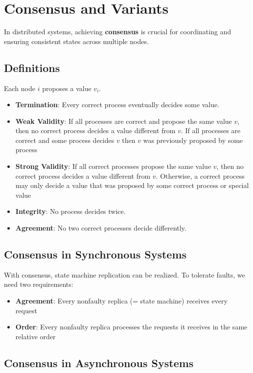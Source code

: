 \documentclass[12pt,A4]{extarticle}
\newcommand{\highlight}[1]{\textcolor{highlightColor}{\textbf{#1}}}
\begin{document}
\section{Consensus and Variants}
In distributed systems, achieving \highlight{consensus} is crucial for coordinating and ensuring consistent states across multiple nodes.

\subsection{Definitions}
Each node $i$ proposes a value $v_i$.
\begin{itemize}
  \item \highlight{Termination}: Every correct process eventually decides some value.
  \item \highlight{Weak Validity}: If all processes are correct and propose the same value $v$, then no correct process decides a value different from $v$. If all processes are correct and some process decides $v$ then $v$ was previously proposed by some process
  \item \highlight{Strong Validity}: If all correct processes propose the same value $v$, then no correct process decides a value different from $v$. Otherwise, a correct process may only decide a value that was proposed by some correct process or special value
  \item \highlight{Integrity}: No process decides twice.
  \item \highlight{Agreement}: No two correct processes decide differently.
\end{itemize}

\subsection{Consensus in Synchronous Systems}
With consensus, state machine replication can be realized. To tolerate faults, we need two requirements:
\begin{itemize}
  \item{\highlight{Agreement}: Every nonfaulty replica (= state machine) receives every request}
  \item{\highlight{Order}: Every nonfaulty replica processes the requests it receives in the same relative order}
\end{itemize}

\subsection{Consensus in Asynchronous Systems}
\end{document}
